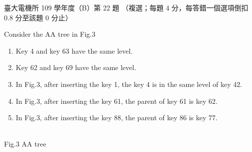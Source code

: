 \begin{pastexam}[label={px:ntu-109-ee-ds-22}]{臺大電機所 109 學年度（B）第 22 題}
（複選；每題 4 分，每答錯一個選項倒扣 0.8 分至該題 0 分止）

Consider the AA tree in Fig.3
\begin{enumerate}[label=(\Alph*)]
\item Key 4 and key 63 have the same level.
\item Key 62 and key 69 have the same level.
\item In Fig.3, after inserting the key 1, the key 4 is in the same level of key 42.
\item In Fig.3, after inserting the key 61, the parent of key 61 is key 62.
\item In Fig.3, after inserting the key 88, the parent of key 86 is key 77.
\end{enumerate}

\begin{center}
\\ Fig.3 AA tree
\end{center}
\end{pastexam}

